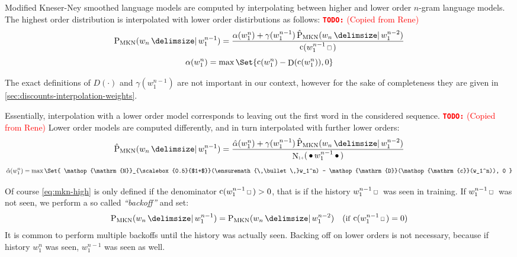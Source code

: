 \documentclass[11pt,a4paper]{report}
\newcommand*{\Scale}[2][4]{\scalebox{#1}{$#2$}}%
\newcommand{\DummyArg}{\cdot}
\DeclareMathOperator{\Count}{c}
\DeclareMathOperator{\ContCount}{N}
\newcommand{\ContCountIp}  {\ContCount_{\Scale[0.5]{1+}}}
\DeclareMathOperator{\Discount}{D}
\newcommand{\Skp}{\ensuremath{\,\Scale[0.7]{\square}\,}}
\newcommand{\WSkp}{\ensuremath{\,\bullet\,}}
\newenvironment{draft}{\color{draftcolor}}{}
\newcommand{\todo}[1]{\textcolor{red}{{\footnotesize\textbf{\texttt{TODO:}}} #1}}
\begin{document}
\begin{draft}
Modified Kneser-Ney smoothed language models are computed by interpolating
between higher and lower order $n$-gram language models.
The highest order distribution is interpolated with lower order distirbutions
as follows:
\todo{(Copied from Rene)}
\end{draft}
\begin{equation}
  \label{eq:mkn-high}
  \ProbMKN{w_n}{w_1^{n-1}} =
    \frac{\alpha(w_1^n) + \gamma(w_1^{n-1}) \ProbMKN*{w_n}{w_1^{n-2}}}
         {\Count(w_1^{n-1} \Skp)} \\
\end{equation}
\begin{equation}
  \alpha(w_1^n) = \max\Set{\Count(w_1^n) - \Discount(\Count(w_1^n)), 0} \\
\end{equation}

The exact definitions of $D(\DummyArg)$ and $\gamma(w_1^{n-1})$ are not
important in our context, however for the sake of completeness they are given 
in \cref{sec:discounts-interpolation-weights}.

\begin{draft}
Essentially, interpolation with a lower order model corresponds to leaving out
the first word in the considered sequence.
\todo{(Copied from Rene)}
\end{draft}
Lower order models are computed differently, and in turn interpolated with
further lower orders:
\begin{equation}
  \ProbMKN*{w_n}{w_1^{n-1}} =
    \frac{\hat\alpha(w_1^n) + \gamma(w_1^{n-1}) \ProbMKN*{w_n}{w_1^{n-2}}}
         {\ContCountIp(\WSkp w_1^{n-1} \WSkp)} \\
\end{equation}
\begin{equation}
  \hat\alpha(w_1^n) = \max\Set{ \ContCountIp(\WSkp w_1^n) - \Discount(\Count(w_1^n)), 0 }
\end{equation}

Of course \cref{eq:mkn-high} is only defined if the denominator
$\Count(w_1^{n-1} \Skp) > 0$, that is if the history $w_1^{n-1} \Skp$ was seen
in training.
If $w_1^{n-1} \Skp$ was not seen, we perform a so called \emph{``backoff''}
and set:
\begin{align}
  \ProbMKN{w_n}{w_1^{n-1}} = \ProbMKN{w_n}{w_1^{n-2}}
      && \small{(\text{if} \: \Count(w_1^{n-1} \Skp) = 0)}
\end{align}
It is common to perform multiple backoffs until the history was actually seen.
Backing off on lower orders is not necessary, because
if history $w_1^n$ was seen, $w_1^{n-1}$ was seen as well.
\end{document}
